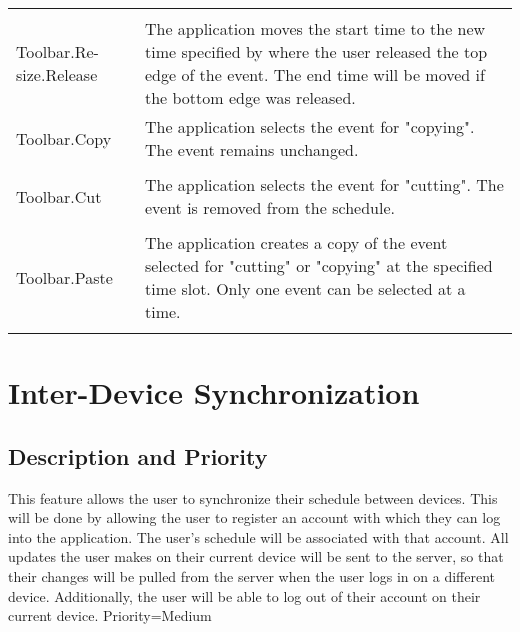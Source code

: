 \documentclass{scrreprt}
\begin{document}
\begin{center}
\begin{longtable}{ | p{6cm} | p{9cm} | }
    & \\
    Toolbar.Re-size.Release & The application moves the start time to the new time
    specified by where the user released the top edge of the event. The end time
    will be moved if the bottom edge was released.\\
    \hline
    Toolbar.Copy & The application selects the event for "copying". The
    event remains unchanged.\\
    & \\
    Toolbar.Cut & The application selects the event for "cutting". The
    event is removed from the schedule.\\
    & \\
    Toolbar.Paste & The application creates a copy of the event selected
    for "cutting" or "copying" at the specified time slot. Only one
    event can be selected at a time.\\
    & \\
    \hline
    \end{longtable}
\end{center}

\section{Inter-Device Synchronization}

\subsection{Description and Priority}
This feature allows the user to synchronize their schedule between devices.
This will be done by allowing the user to register an account with which they
can log into the application. The user's schedule will be associated with that
account. All updates the user makes on their current device will be sent to the
server, so that their changes will be pulled from the server when the user logs
in on a different device. Additionally, the user will be able to log out of
their account on their current device. Priority=Medium
\end{document}
